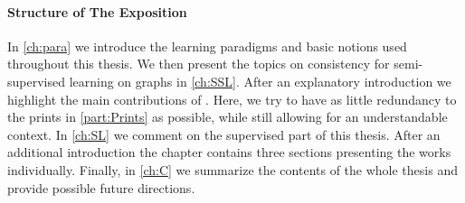 \paragraph{Structure of The Exposition} In \cref{ch:para} we introduce the learning paradigms and basic notions used throughout this thesis. We then present the topics on consistency for semi-supervised learning on graphs in \cref{ch:SSL}. After an explanatory introduction we highlight the main contributions of \cite{roith2022continuum,bungert2021uniform}. Here, we try to have as little redundancy to the prints in \cref{part:Prints} as possible, while still allowing for an understandable context. In \cref{ch:SL} we comment on the supervised part of this thesis. After an additional introduction the chapter contains three sections presenting the works \cite{kabri2023resolution,bungert2021clip,bungert2022bregman} individually. Finally, in \cref{ch:C} we summarize the contents of the whole thesis and provide possible future directions.

